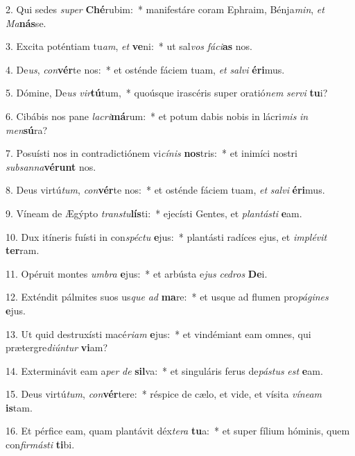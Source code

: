 2. Qui sedes \textit{su}\textit{per} \textbf{Ché}rubim:~*  manifestáre coram Ephraim, Bénja\textit{min}, \textit{et} \textit{Ma}\textbf{nás}se.\

3. Excita poténtiam tu\textit{am}, \textit{et} \textbf{ve}ni:~*  ut sal\textit{vos} \textit{fá}\textit{ci}\textbf{as} nos.\

4. De\textit{us}, \textit{con}\textbf{vér}te nos:~*  et osténde fáciem tuam, \textit{et} \textit{sal}\textit{vi} \textbf{é}\textbf{ri}mus.\

5. Dómine, De\textit{us} \textit{vir}\textbf{tú}tum,~*  quoúsque irascéris super oratió\textit{nem} \textit{ser}\textit{vi} \textbf{tu}i?\

6. Cibábis nos pane \textit{la}\textit{cri}\textbf{má}rum:~*  et potum dabis nobis in lácri\textit{mis} \textit{in} \textit{men}\textbf{sú}ra?\

7. Posuísti nos in contradictiónem vi\textit{cí}\textit{nis} \textbf{nos}tris:~*  et inimíci nostri \textit{sub}\textit{san}\textit{na}\textbf{vé}\textbf{runt} nos.\

8. Deus virtú\textit{tum}, \textit{con}\textbf{vér}te nos:~*  et osténde fáciem tuam, \textit{et} \textit{sal}\textit{vi} \textbf{é}\textbf{ri}mus.\

9. Víneam de Ægýpto \textit{trans}\textit{tu}\textbf{lís}ti:~*  ejecísti Gentes, et \textit{plan}\textit{tás}\textit{ti} \textbf{e}am.\

10. Dux itíneris fuísti in con\textit{spéc}\textit{tu} \textbf{e}jus:~*  plantásti radíces ejus, et \textit{im}\textit{plé}\textit{vit} \textbf{ter}ram.\

11. Opéruit montes \textit{um}\textit{bra} \textbf{e}jus:~*  et arbústa e\textit{jus} \textit{ce}\textit{dros} \textbf{De}i.\

12. Exténdit pálmites suos us\textit{que} \textit{ad} \textbf{ma}re:~*  et usque ad flumen pro\textit{pá}\textit{gi}\textit{nes} \textbf{e}jus.\

13. Ut quid destruxísti macé\textit{ri}\textit{am} \textbf{e}jus:~*  et vindémiant eam omnes, qui prætergre\textit{di}\textit{ún}\textit{tur} \textbf{vi}am?\

14. Exterminávit eam a\textit{per} \textit{de} \textbf{sil}va:~*  et singuláris ferus de\textit{pás}\textit{tus} \textit{est} \textbf{e}am.\

15. Deus virtú\textit{tum}, \textit{con}\textbf{vér}tere:~*  réspice de cælo, et vide, et vísita \textit{ví}\textit{ne}\textit{am} \textbf{is}tam.\

16. Et pérfice eam, quam plantávit déx\textit{te}\textit{ra} \textbf{tu}a:~*  et super fílium hóminis, quem con\textit{fir}\textit{más}\textit{ti} \textbf{ti}bi.\

